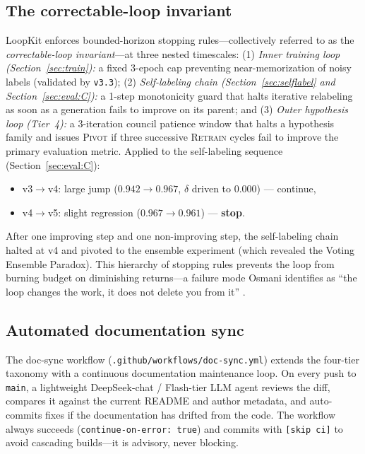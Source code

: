 \subsection{The correctable-loop invariant}
\label{sec:loopkit:correctable}

LoopKit enforces bounded-horizon stopping rules---collectively referred to as
the \emph{correctable-loop invariant}---at three nested timescales:
(1) \emph{Inner training loop (Section~\ref{sec:train}):} a fixed 3-epoch cap
preventing near-memorization of noisy labels (validated by \texttt{v3.3});
(2) \emph{Self-labeling chain (Section~\ref{sec:selflabel} and
Section~\ref{sec:eval:C}):} a 1-step monotonicity guard that halts iterative
relabeling as soon as a generation fails to improve on its parent; and
(3) \emph{Outer hypothesis loop (Tier~4):} a 3-iteration council patience
window that halts a hypothesis family and issues \textsc{Pivot} if three
successive \textsc{Retrain} cycles fail to improve the primary evaluation
metric. Applied to the self-labeling sequence (Section~\ref{sec:eval:C}):
\begin{itemize}
  \item v3$\to$v4: large jump ($0.942\to0.967$, $\delta$ driven to $0.000$) ---
        continue,
  \item v4$\to$v5: slight regression ($0.967\to0.961$) --- \textbf{stop}.
\end{itemize}
After one improving step and one non-improving step, the self-labeling chain
halted at v4 and pivoted to the ensemble experiment (which revealed the Voting
Ensemble Paradox). This hierarchy of stopping rules prevents the loop from
burning budget on diminishing returns---a failure mode Osmani identifies as
``the loop changes the work, it does not delete you from it''
\citep{osmani2026loop}.

\subsection{Automated documentation sync}
\label{sec:loopkit:docsync}

The doc-sync workflow (\texttt{.github/workflows/doc-sync.yml}) extends the
four-tier taxonomy with a continuous documentation maintenance loop. On every
push to \texttt{main}, a lightweight DeepSeek-chat / Flash-tier LLM agent reviews the diff, compares it
against the current README and author metadata, and auto-commits fixes if the
documentation has drifted from the code. The workflow always succeeds
(\texttt{continue-on-error: true}) and commits with \texttt{[skip ci]} to
avoid cascading builds---it is advisory, never blocking.

